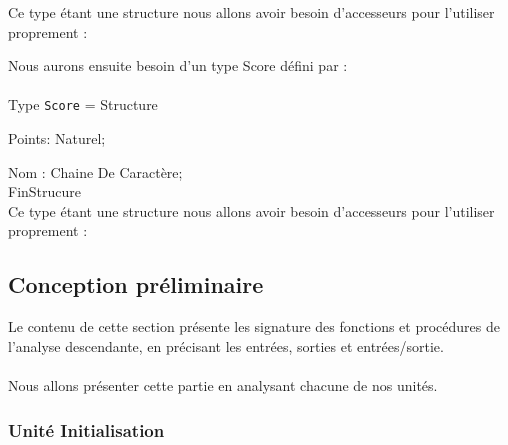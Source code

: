 \documentclass[11pt,a4paper]{article}
\begin{document}
        Ce type étant une structure nous allons avoir besoin d'accesseurs pour l'utiliser proprement : 
        
        \begin{algorithm}
        \end{algorithm}      
        
        \newpage
        
        Nous aurons ensuite besoin d'un type Score défini par :\\\\
        Type \verb|Score| = Structure
        
                Points: Naturel;
                
                Nom : Chaine De Caractère; \\
        FinStrucure\\
				
        Ce type étant une structure nous allons avoir besoin d'accesseurs pour l'utiliser proprement : 
        
        \begin{algorithm}
        \end{algorithm} 

    \newpage
		
    \subsection{Conception préliminaire}
    
    
        Le contenu de cette section présente les signature des fonctions et procédures de l'analyse descendante, en précisant les entrées, sorties et entrées/sortie.\\\\
        Nous allons présenter cette partie en analysant chacune de nos unités.
    
        \subsubsection{Unité Initialisation}
        
\end{document}

